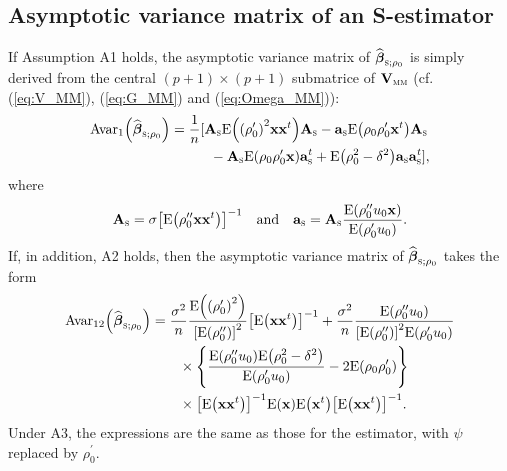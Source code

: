 \subsection{Asymptotic variance matrix of an S-estimator}

If Assumption A1 holds, the asymptotic variance matrix of $\widehat
{\boldsymbol\beta}_{\stsc{S};\rho_{0}}$ is simply derived from the central
$(p+1)\times(p+1)$ submatrice of $\mathbf{V}_{\stsc{MM}}$ (cf.
(\ref{eq:V_MM}), (\ref{eq:G_MM}) and (\ref{eq:Omega_MM})):
\begin{align*}
\mathrm{Avar}_{1}\left(  \sthat{\boldsymbol\beta}_{\stsc{S};\rho_{0}%
}\right)   &  =\frac{1}{n}[\mathbf{A}_{\stsc{S}}\mathrm{E}\left(  \left(
\rho_{0}^{\prime}\right)  ^{2}\mathbf{xx}^{t}\right)  \mathbf{A}_{\stsc{S}%
}-\mathbf{a}_{\stsc{S}}\mathrm{E}\left(  \rho_{0}\rho_{0}^{\prime}%
\stvec{x}^{t}\right)  \mathbf{A}_{\stsc{S}}\\
&  \hspace{1cm}-\mathbf{A}_{\stsc{S}}\mathrm{E}\left(  \rho_{0}\rho
_{0}^{\prime}\stvec{x}\right)  \mathbf{a}_{\stsc{S}}^{t}+\mathrm{E}\left(
\rho_{0}^{2}-\delta^{2}\right)  \mathbf{a}_{\stsc{S}}\mathbf{a}_{\stsc{S}%
}^{t}],
\end{align*}
where
\[
\mathbf{A}_{\stsc{S}}=\sigma\left[  \mathrm{E}\left(  \rho_{0}^{\prime
\prime}\mathbf{xx}^{t}\right)  \right]  ^{-1}\quad\text{and\quad}%
\mathbf{a}_{\stsc{S}}=\mathbf{A}_{\stsc{S}}\frac{\mathrm{E}\left(
\rho_{0}^{\prime\prime}u_{0}\stvec{x}\right)  }{\mathrm{E}\left(  \rho
_{0}^{\prime}u_{0}\right)  }.
\]
If, in addition, A2 holds, then the asymptotic variance matrix of
$\sthat{\boldsymbol\beta}_{\stsc{S};\rho_{0}}$ takes the form
\begin{align*}
\mathrm{Avar}_{12}\left(  \sthat{\boldsymbol\beta}_{\stsc{S};\rho_{0}%
}\right)   &  =\frac{\sigma^{2}}{n}\frac{\mathrm{E}\left(  \left(  \rho
_{0}^{\prime}\right)  ^{2}\right)  }{\left[  \mathrm{E}\left(  \rho
_{0}^{\prime\prime}\right)  \right]  ^{2}}\left[  \mathrm{E}\left(
\mathbf{xx}^{t}\right)  \right]  ^{-1}+\frac{\sigma^{2}}{n}\frac
{\mathrm{E}\left(  \rho_{0}^{\prime\prime}u_{0}\right)  }{\left[
\mathrm{E}\left(  \rho_{0}^{\prime\prime}\right)  \right]  ^{2}\mathrm{E}%
\left(  \rho_{0}^{\prime}u_{0}\right)  }\\
&  \qquad\times\left\{  \frac{\mathrm{E}\left(  \rho_{0}^{\prime\prime}%
u_{0}\right)  \mathrm{E}\left(  \rho_{0}^{2}-\delta^{2}\right)  }%
{\mathrm{E}\left(  \rho_{0}^{\prime}u_{0}\right)  }-2\mathrm{E}\left(
\rho_{0}\rho_{0}^{\prime}\right)  \right\} \\
&  \qquad\times\left[  \mathrm{E}\left(  \mathbf{xx}^{t}\right)  \right]
^{-1}\mathrm{E}\left(  \stvec{x}\right)  \mathrm{E}\left(  \stvec{x}%
^{t}\right)  \left[  \mathrm{E}\left(  \mathbf{xx}^{t}\right)  \right]  ^{-1}.
\end{align*}
Under A3, the expressions are the same as those for the  estimator, with
$\psi$ replaced by $\rho_{0}^{\prime}$.

